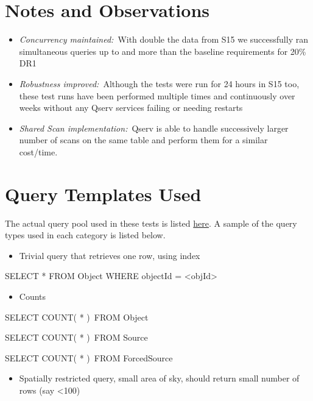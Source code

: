 \documentclass[DM,toc]{lsstdoc}
\begin{document}
\section{Notes and Observations}\label{notes-and-observations}

\begin{itemize}
\item
  \emph{Concurrency maintained:}~With double the data from S15 we
  successfully ran simultaneous queries up to and more than the baseline
  requirements for 20\% DR1
\item
  \emph{Robustness improved:}~Although the tests were run for 24 hours
  in S15 too, these test runs have been performed multiple times and
  continuously over weeks without any Qserv services failing or needing
  restarts
\item
  \emph{Shared Scan implementation:}~Qserv is able to handle
  successively larger number of scans on the same table and perform them
  for a similar cost/time.~
\end{itemize}

\section{Query Templates Used}\label{query-templates-used}

The actual query pool used in these tests is listed
\href{file:////download/attachments/54854103/query_pools.txt\%3fversion=1\&modificationDate=1494281645000\&api=v2}{here}.
A sample of the query types used in each category is listed below.

\begin{itemize}
\item
  Trivial query that retrieves one row, using index
\end{itemize}

SELECT * FROM Object WHERE objectId = \textless{}objId\textgreater{}

\begin{itemize}
\item
  Counts
\end{itemize}

SELECT COUNT( * )~FROM Object

SELECT COUNT( * )~FROM Source

SELECT COUNT( * )~FROM ForcedSource

\begin{itemize}
\item
  Spatially restricted query, small area of sky, should return small
  number of rows (say \textless{}100)
\end{itemize}
\end{document}
